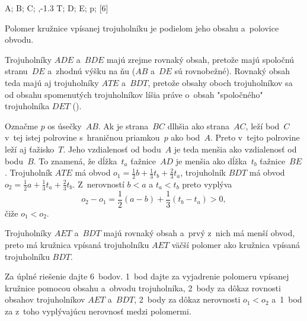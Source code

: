 {%
\fontplace
\tpoint A; \tpoint B; \bpoint C; \rtpoint{},-1.3 T;
\lBpoint D; \rBpoint E; \lpoint p;
[6] \hfil\Obr 

Polomer kružnice vpísanej trojuholníku je podielom jeho obsahu a~polovice obvodu.

Trojuholníky $ADE$ a~$BDE$ majú zrejme rovnaký obsah, pretože majú
spoločnú stranu~$DE$ a~zhodnú výšku na ňu ($AB$ a~$DE$ sú rovnobežné).
Rovnaký obsah teda majú aj trojuholníky $ATE$ a~$BDT$, pretože
obsahy oboch trojuholníkov sa od obsahu spomenutých trojuholníkov líšia práve o~obsah
"spoločného" trojuholníka $DET$ (\obr).

\inspicture{}

Označme $p$ os úsečky~$AB$. Ak je strana~$BC$ dlhšia ako strana~$AC$, leží bod~$C$ v~tej istej polrovine s~hraničnou priamkou~$p$ ako bod~$A$. Preto v~tejto polrovine leží aj ťažisko~$T$. Jeho vzdialenosť od bodu~$A$ je teda menšia ako vzdialenosť od bodu~$B$. To znamená, že dĺžka~$t_a$ ťažnice~$AD$ je menšia ako dĺžka~$t_b$ ťažnice~$BE$. Trojuholník $ATE$ má obvod $o_1=\frac12 b+\frac13 t_b+\frac23 t_a$, trojuholník $BDT$ má obvod $o_2=\frac12 a+\frac13 t_a+\frac23 t_b$. Z~nerovností $b<a$ a $t_a<t_b$ preto vyplýva
$$
o_2-o_1=\frac12(a-b)+\frac13(t_b-t_a)>0,
$$
čiže $o_1<o_2$. 

Trojuholníky $AET$ a~$BDT$ majú rovnaký obsah a~prvý z~nich má menší obvod, preto má kružnica vpísaná trojuholníku $AET$ väčší polomer ako kružnica vpísaná trojuholníku $BDT$.

\nobreak\medskip\petit\noindent
Za úplné riešenie dajte 6~bodov.
1~bod dajte za vyjadrenie polomeru vpísanej kružnice pomocou obsahu a~obvodu trojuholníka, 2~body za dôkaz rovnosti obsahov trojuholníkov $AET$ a~$BDT$, 2~body za dôkaz nerovnosti $o_1<o_2$ a~1~bod za z~toho vyplývajúcu nerovnosť medzi polomermi.
\endpetit
\bigbreak
}

